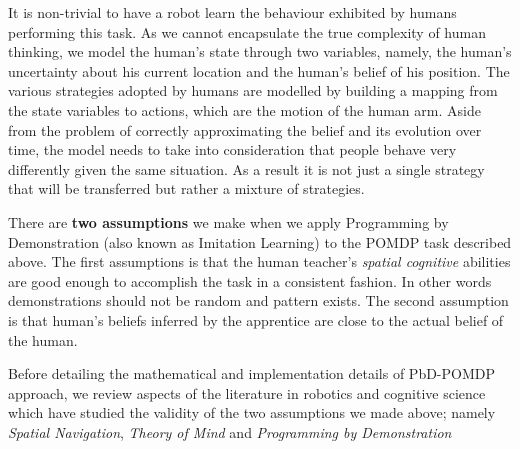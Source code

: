It is non-trivial to have a robot learn the behaviour exhibited by humans performing this task. As we cannot encapsulate the true complexity of 
human thinking, we model the human's state through two variables, namely, the human's uncertainty about his current location and the human's  
belief of his position. The various strategies adopted by humans are modelled by building a mapping from the state variables to actions, which are the motion of 
the human arm. Aside from the problem of correctly approximating the belief and its evolution over time, the model needs to take into consideration
that people behave very differently given the same situation. As a result it is not just a single strategy that will be transferred but rather a mixture 
of strategies. 

There are \textbf{two assumptions} we make when we apply Programming by Demonstration (also known as Imitation Learning) to the POMDP task described above. 
The first assumptions is that the human teacher's \textit{spatial cognitive} abilities are good enough to accomplish 
the task in a consistent fashion. In other words demonstrations should not be random and pattern exists. The second assumption is that human's beliefs inferred  
by the apprentice are close to the actual belief of the human. 

Before detailing the mathematical and implementation details of PbD-POMDP approach, we review aspects of the literature in robotics and cognitive science 
which have studied the validity of the two assumptions we made above; namely \textit{Spatial Navigation}, \textit{Theory of Mind} and \textit{Programming by Demonstration}




